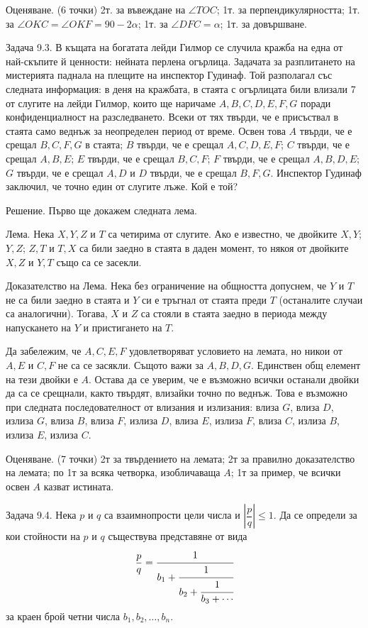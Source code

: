 Оценяване. (6 точки) 2т. за въвеждане на $\angle TOC$; 1т. за перпендикулярността; 1т. за $\angle OKC=\angle OKF=90-2\alpha$; 1т. за $\angle DFC=\alpha$; 1т. за довършване.

Задача 9.3. В къщата на богатата лейди Гилмор се случила кражба на една от най-скъпите й ценности: нейната перлена огърлица. Задачата за разплитането на мистерията паднала на плещите на инспектор Гудинаф. Той разполагал със следната информация: в деня на кражбата, в стаята с огърлицата били влизали 7 от слугите на лейди Гилмор, които ще наричаме $A,B,C,D,E,F,G$ поради конфиденциалност на разследването. Всеки от тях твърди, че е присъствал в стаята само веднъж за неопределен период от време. Освен това $A$ твърди, че е срещал $B,C,F,G$ в стаята; $B$ твърди, че е срещал $A,C,D,E,F$; $C$ твърди, че е срещал $A,B,E$; $E$ твърди, че е срещал $B,C,F$; $F$ твърди, че е срещал $A,B,D,E$; $G$ твърди, че е срещал $A,D$ и $D$ твърди, че е срещал $B,F,G$. Инспектор Гудинаф заключил, че точно един от слугите лъже. Кой е той?

Решение. Първо ще докажем следната лема.

Лема. Нека $X,Y,Z$ и $T$ са четирима от слугите. Ако е известно, че двойките $X,Y$; $Y,Z$; $Z,T$ и $T,X$ са били заедно в стаята в даден момент, то някоя от двойките $X,Z$ и $Y,T$ също са се засекли.

Доказателство на Лема. Нека без ограничение на общността допуснем, че $Y$ и $T$ не са били заедно в стаята и $Y$ си е тръгнал от стаята преди $T$ (останалите случаи са аналогични). Тогава, $X$ и $Z$ са стояли в стаята заедно в периода между напускането на $Y$ и пристигането на $T$.

Да забележим, че $A,C,E,F$ удовлетворяват условието на лемата, но никои от $A,E$ и $C,F$ не са се засякли. Същото важи за $A,B,D,G$. Единствен общ елемент на тези двойки е $A$. Остава да се уверим, че е възможно всички останали двойки да са се срещнали, както твърдят, влизайки точно по веднъж. Това е възможно при следната последователност от влизания и излизания: влиза $G$, влиза $D$, излиза $G$, влиза $B$, влиза $F$, излиза $D$, влиза $E$, излиза $F$, влиза $C$, излиза $B$, излиза $E$, излиза $C$.

Оценяване. (7 точки) 2т за твърдението на лемата; 2т за правилно доказателство на лемата; по 1т за всяка четворка, изобличаваща $A$; 1т за пример, че всички освен $A$ казват истината.

Задача 9.4. Нека $p$ и $q$ са взаимнопрости цели числа и $\left|\dfrac pq\right|\le1$. Да се определи за кои стойности на $p$ и $q$ съществува представяне от вида
$$
\frac pq=\cfrac{1}{b_1+\cfrac{1}{b_2+\cfrac{1}{b_3+\cdots}}}
$$
за краен брой четни числа $b_1,b_2,\ldots,b_n$.

